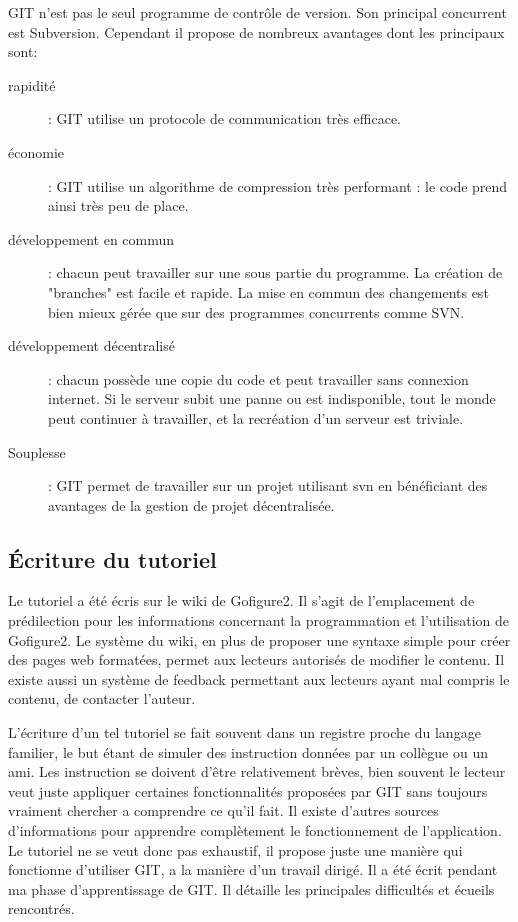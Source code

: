 GIT n'est pas le seul programme de contrôle de version. Son principal concurrent est Subversion.
Cependant il propose de nombreux avantages dont les principaux sont:
\begin{description}
  \item[rapidité] : GIT utilise un protocole de communication très efficace.
  \item[économie] : GIT utilise un algorithme de compression très performant : le code prend ainsi très peu de place.
  \item[développement en commun] : chacun peut travailler sur une sous partie du programme. La création de "branches" est facile et
  rapide. La mise en commun des changements est bien mieux gérée que sur des programmes concurrents comme SVN.
  \item[développement décentralisé] : chacun possède une copie du code et peut travailler sans connexion internet. 
  Si le serveur subit une panne ou est indisponible, tout le monde peut continuer à travailler, et la recréation d'un serveur est triviale.
  \item[Souplesse] : GIT permet de travailler sur un projet utilisant svn en bénéficiant des avantages de la gestion de projet
  décentralisée.
\end{description}


\subsection{Écriture du tutoriel}

Le tutoriel a été écris sur le wiki de Gofigure2. Il s'agit de l'emplacement de prédilection pour les informations 
concernant la programmation et l'utilisation de Gofigure2. Le système du wiki, en plus de proposer une syntaxe simple 
pour créer des pages web formatées, permet aux lecteurs autorisés de modifier le contenu. 
Il existe aussi un système de feedback permettant aux lecteurs ayant mal compris le contenu, de contacter l'auteur.

L'écriture d'un tel tutoriel se fait souvent dans un registre proche du langage familier,
le but étant de simuler des instruction données par un collègue ou un ami. 
Les instruction se doivent d'être relativement brèves, bien souvent le lecteur veut juste appliquer certaines fonctionnalités 
proposées par GIT sans toujours vraiment chercher a comprendre ce qu'il fait. 
Il existe d'autres sources d'informations pour apprendre complètement le fonctionnement de l'application.
Le tutoriel ne se veut donc pas exhaustif, il propose juste une manière qui fonctionne d'utiliser GIT,
a la manière d'un travail dirigé. Il a été écrit pendant ma phase d'apprentissage de GIT. 
Il détaille les principales difficultés et écueils rencontrés. 

